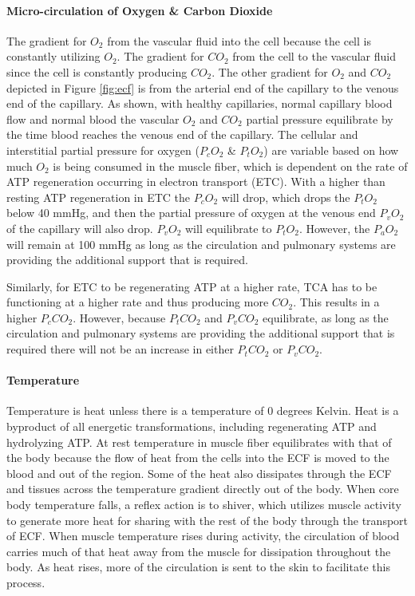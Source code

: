 \paragraph{Micro-circulation of Oxygen \& Carbon Dioxide}

The gradient for $O_2$ from the vascular fluid into the cell because the cell is constantly utilizing $O_2$. The gradient for $CO_2$ from the cell to the vascular fluid since the cell is constantly producing $CO_2$. The other gradient for $O_2$ and $CO_2$ depicted in Figure \ref{fig:ecf} is from the arterial end of the capillary to the venous end of the capillary. As shown, with healthy capillaries, normal capillary blood flow and normal blood the vascular $O_2$ and $CO_2$ partial pressure equilibrate by the time blood reaches the venous end of the capillary. The cellular and interstitial partial pressure for oxygen ($P_c O_2$ \& $P_t O_2$) are variable based on how much $O_2$ is being consumed in the muscle fiber, which is dependent on the rate of ATP regeneration occurring in electron transport (ETC). With a higher than resting ATP regeneration in ETC the $P_c O_2$ will drop, which drops the $P_t O_2$ below 40 mmHg, and then the partial pressure of oxygen at the venous end $P_v O_2$ of the capillary will also drop. $P_v O_2$ will equilibrate to $P_t O_2$. However, the $P_a O_2$ will remain at 100 mmHg as long as the circulation and pulmonary systems are providing the additional support that is required.

Similarly, for ETC to be regenerating ATP at a higher rate, TCA has to be functioning at a higher rate and thus producing more $CO_2$. This results in a higher $P_c CO_2$. However, because $P_t CO_2$ and $P_v CO_2$ equilibrate, as long as the circulation and pulmonary systems are providing the additional support that is required there will not be an increase in either $P_t CO_2$ or $P_v CO_2$.

\paragraph{Temperature}

Temperature is heat unless there is a temperature of 0 degrees Kelvin. Heat is a byproduct of all energetic transformations, including regenerating ATP and hydrolyzing ATP. At rest temperature in muscle fiber equilibrates with that of the body because the flow of heat from the cells into the ECF is moved to the blood and out of the region. Some of the heat also dissipates through the ECF and tissues across the temperature gradient directly out of the body. When core body temperature falls, a reflex action is to shiver, which utilizes muscle activity to generate more heat for sharing with the rest of the body through the transport of ECF. When muscle temperature rises during activity, the circulation of blood carries much of that heat away from the muscle for dissipation throughout the body. As heat rises, more of the circulation is sent to the skin to facilitate this process.

